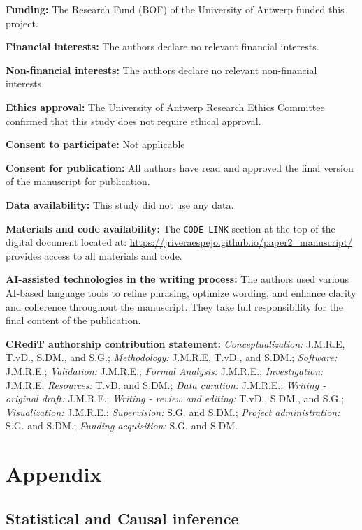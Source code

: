 \documentclass[
  authoryear,
  review,
  1p]{elsarticle}
\begin{document}
\textbf{Funding:} The Research Fund (BOF) of the University of Antwerp
funded this project.

\textbf{Financial interests:} The authors declare no relevant financial
interests.

\textbf{Non-financial interests:} The authors declare no relevant
non-financial interests.

\textbf{Ethics approval:} The University of Antwerp Research Ethics
Committee confirmed that this study does not require ethical approval.

\textbf{Consent to participate:} Not applicable

\textbf{Consent for publication:} All authors have read and approved the
final version of the manuscript for publication.

\textbf{Data availability:} This study did not use any data.

\textbf{Materials and code availability:} The \texttt{CODE\ LINK}
section at the top of the digital document located at:
\url{https://jriveraespejo.github.io/paper2_manuscript/} provides access
to all materials and code.

\textbf{AI-assisted technologies in the writing process:} The authors
used various AI-based language tools to refine phrasing, optimize
wording, and enhance clarity and coherence throughout the manuscript.
They take full responsibility for the final content of the publication.

\textbf{CRediT authorship contribution statement:}
\emph{Conceptualization:} J.M.R.E, T.vD., S.DM., and S.G.;
\emph{Methodology:} J.M.R.E, T.vD., and S.DM.; \emph{Software:}
J.M.R.E.; \emph{Validation:} J.M.R.E.; \emph{Formal Analysis:} J.M.R.E.;
\emph{Investigation:} J.M.R.E; \emph{Resources:} T.vD. and S.DM.;
\emph{Data curation:} J.M.R.E.; \emph{Writing - original draft:}
J.M.R.E.; \emph{Writing - review and editing:} T.vD., S.DM., and S.G.;
\emph{Visualization:} J.M.R.E.; \emph{Supervision:} S.G. and S.DM.;
\emph{Project administration:} S.G. and S.DM.; \emph{Funding
acquisition:} S.G. and S.DM.

\newpage{}

\section{Appendix}\label{sec-appendix}

\subsection{Statistical and Causal inference}\label{sec-appendixB}
\end{document}
